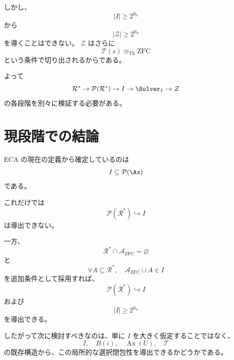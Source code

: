 \documentclass[a4paper,11pt]{ltjsarticle}
\begin{document}
しかし、
\[
|I|\ge2^{\aleph_0}
\]
から
\[
|\mathcal{Z}|\ge2^{\aleph_0}
\]
を導くことはできない。 $\mathcal{Z}$ はさらに
\[
\mathcal{T}(s)\cong_{\mathrm{Th}}\mathrm{ZFC}
\]
という条件で切り出されるからである。

よって
\[
\mathcal{R}^*
\to
\mathcal{P}(\mathcal{R}^*)
\to
I
\to
\Solver_I
\to
\mathcal{Z}
\]
の各段階を別々に検証する必要がある。

\section{現段階での結論}
ECA の現在の定義から確定しているのは
\[
I\subseteq\mathcal{P}(\Ax)
\]
である。

これだけでは
\[
\mathcal{P}(\mathcal{R}^*)\hookrightarrow I
\]
は導出できない。

一方、
\[
\mathcal{R}^*\cap\mathcal{A}_{\mathrm{ZFC}}=\varnothing
\]
と
\[
\forall A\subseteq\mathcal{R}^*,
\quad
\mathcal{A}_{\mathrm{ZFC}}\cup A\in I
\]
を追加条件として採用すれば、
\[
\mathcal{P}(\mathcal{R}^*)\hookrightarrow I
\]
および
\[
|I|\ge2^{\aleph_0}
\]
を導出できる。

したがって次に検討すべきなのは、単に $I$ を大きく仮定することではなく、
\[
I,\quad B(i),\quad\operatorname{Ax}(U),\quad\mathcal{T}
\]
の既存構造から、この局所的な選択閉包性を導出できるかどうかである。
\end{document}
